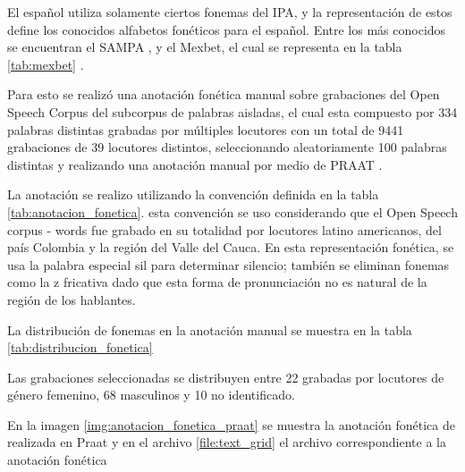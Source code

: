 



El español utiliza solamente ciertos fonemas del IPA, y la representación de estos define los conocidos alfabetos fonéticos para el español. Entre los más conocidos se encuentran el SAMPA \cite{SAMPA}, y el Mexbet, el cual se representa en la tabla \ref{tab:mexbet} \cite{mexbet}. 



Para esto  se realizó una anotación fonética manual sobre grabaciones del Open Speech Corpus \cite{Collazos2015} del subcorpus de palabras aisladas, el cual esta compuesto por 334 palabras distintas grabadas por múltiples locutores con un total de 9441 grabaciones de 39 locutores distintos, seleccionando aleatoriamente 100 palabras distintas y realizando una anotación manual por medio de PRAAT \cite{Praat}.

La anotación se realizo utilizando la convención definida en la tabla \ref{tab:anotacion_fonetica}. esta convención se uso considerando que el Open Speech corpus - words fue grabado en su totalidad por locutores latino americanos, del país Colombia y la región del Valle del Cauca. En esta representación fonética, se usa la palabra especial sil para determinar silencio; también se eliminan fonemas como la z fricativa  dado que esta forma de pronunciación no es natural de la región de los hablantes.




La distribución de fonemas en la anotación manual se muestra en la tabla \ref{tab:distribucion_fonetica}



Las grabaciones seleccionadas se distribuyen entre 22 grabadas por locutores de género femenino, 68 masculinos y 10 no identificado.

En la imagen \ref{img:anotacion_fonetica_praat} se muestra la anotación fonética de  realizada en Praat y en el archivo \ref{file:text_grid} el archivo correspondiente a la anotación fonética



